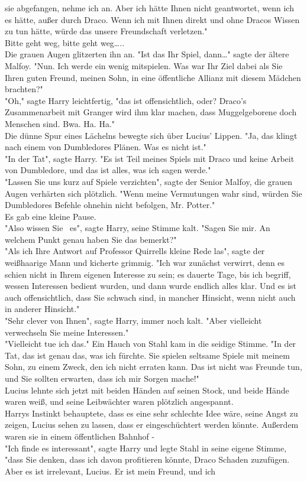 {sie abgefangen, nehme ich an. Aber ich hätte Ihnen nicht geantwortet, wenn ich es hätte, außer durch Draco. Wenn ich mit Ihnen direkt und ohne Dracos Wissen zu tun hätte, würde das unsere Freundschaft verletzen."\\ Bitte geht weg, bitte geht weg…..\\ Die grauen Augen glitzerten ihn an. "Ist das Ihr Spiel, dann…" sagte der ältere Malfoy. "Nun. Ich werde ein wenig mitspielen. Was war Ihr Ziel dabei als Sie Ihren guten Freund, meinen Sohn, in eine öffentliche Allianz mit diesem Mädchen brachten?"\\ "Oh," sagte Harry leichtfertig, "das ist offensichtlich, oder? Draco's Zusammenarbeit mit Granger wird ihm klar machen, dass Muggelgeborene doch Menschen sind. Bwa. Ha. Ha."\\ Die dünne Spur eines Lächelns bewegte sich über Lucius' Lippen. "Ja, das klingt nach einem von Dumbledores Plänen. Was es nicht ist."\\ "In der Tat", sagte Harry. "Es ist Teil meines Spiels mit Draco und keine Arbeit von Dumbledore, und das ist alles, was ich sagen werde."\\ "Lassen Sie uns kurz auf Spiele verzichten", sagte der Senior Malfoy, die grauen Augen verhärten sich plötzlich. "Wenn meine Vermutungen wahr sind, würden Sie Dumbledores Befehle ohnehin nicht befolgen, Mr. Potter."\\ Es gab eine kleine Pause.\\ "Also wissen Sie ~es", sagte Harry, seine Stimme kalt. "Sagen Sie mir. An welchem Punkt genau haben Sie das bemerkt?"\\ "Als ich Ihre Antwort auf Professor Quirrells kleine Rede las", sagte der weißhaarige Mann und kicherte grimmig. "Ich war zunächst verwirrt, denn es schien nicht in Ihrem eigenen Interesse zu sein; es dauerte Tage, bis ich begriff, wessen Interessen bedient wurden, und dann wurde endlich alles klar. Und es ist auch offensichtlich, dass Sie schwach sind, in mancher Hinsicht, wenn nicht auch in anderer Hinsicht."\\ "Sehr clever von Ihnen", sagte Harry, immer noch kalt. "Aber vielleicht verwechseln Sie meine Interessen."\\ "Vielleicht tue ich das." Ein Hauch von Stahl kam in die seidige Stimme. "In der Tat, das ist genau das, was ich fürchte. Sie spielen seltsame Spiele mit meinem Sohn, zu einem Zweck, den ich nicht erraten kann. Das ist nicht was Freunde tun, und Sie sollten erwarten, dass ich mir Sorgen mache!"\\ Lucius lehnte sich jetzt mit beiden Händen auf seinen Stock, und beide Hände waren weiß, und seine Leibwächter waren plötzlich angespannt.\\ Harrys Instinkt behauptete, dass es eine sehr schlechte Idee wäre, seine Angst zu zeigen, Lucius sehen zu lassen, dass er eingeschüchtert werden könnte. Außerdem waren sie in einem öffentlichen Bahnhof -\\ "Ich finde es interessant", sagte Harry und legte Stahl in seine eigene Stimme, "dass Sie denken, dass ich davon profitieren könnte, Draco Schaden zuzufügen. Aber es ist irrelevant, Lucius. Er ist mein Freund, und ich }
